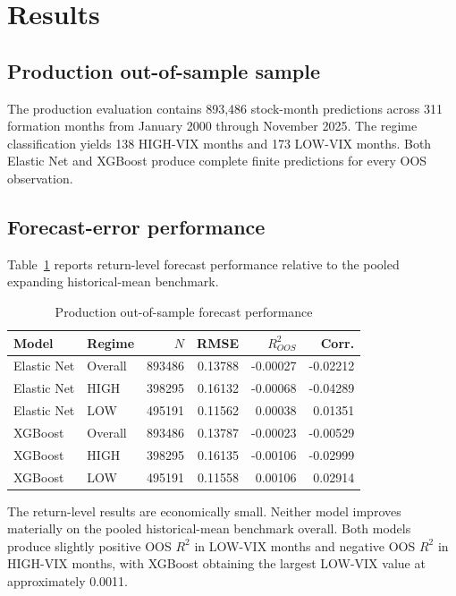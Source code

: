 \section{Results}

\subsection{Production out-of-sample sample}

The production evaluation contains 893,486 stock-month predictions across 311 formation months from January 2000 through November 2025. The regime classification yields 138 HIGH-VIX months and 173 LOW-VIX months. Both Elastic Net and XGBoost produce complete finite predictions for every OOS observation.

\subsection{Forecast-error performance}

Table~\ref{tab:baseline-oos} reports return-level forecast performance relative to the pooled expanding historical-mean benchmark.

\begin{table}[htbp]
\centering
\caption{Production out-of-sample forecast performance}
\label{tab:baseline-oos}
\begin{tabular}{llrrrr}
\hline
Model & Regime & $N$ & RMSE & $R^2_{OOS}$ & Corr. \\
\hline
Elastic Net & Overall & 893486 & 0.13788 & -0.00027 & -0.02212 \\
Elastic Net & HIGH    & 398295 & 0.16132 & -0.00068 & -0.04289 \\
Elastic Net & LOW     & 495191 & 0.11562 &  0.00038 &  0.01351 \\
XGBoost     & Overall & 893486 & 0.13787 & -0.00023 & -0.00529 \\
XGBoost     & HIGH    & 398295 & 0.16135 & -0.00106 & -0.02999 \\
XGBoost     & LOW     & 495191 & 0.11558 &  0.00106 &  0.02914 \\
\hline
\end{tabular}
\end{table}

The return-level results are economically small. Neither model improves materially on the pooled historical-mean benchmark overall. Both models produce slightly positive OOS $R^2$ in LOW-VIX months and negative OOS $R^2$ in HIGH-VIX months, with XGBoost obtaining the largest LOW-VIX value at approximately 0.0011.


